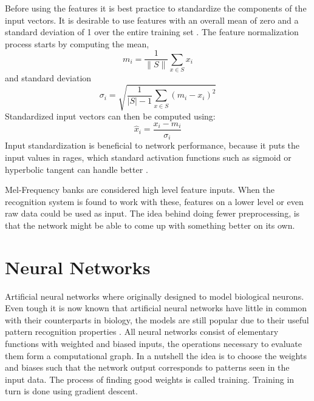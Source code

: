 Before using the features it is best practice to standardize the components of the input vectors. It is desirable to use features with an overall mean of zero and a standard deviation of 1 over the entire training set \cite[page 30]{Graves2008}. The feature normalization process starts by computing the mean,
\begin{equation}
m_i = \frac{1}{\|S\|} \sum\limits_{x \in S} x_i
\end{equation}
and standard deviation
\begin{equation}
\sigma_i = \sqrt{\frac{1}{|S| - 1}\sum\limits_{x \in S}(m_i - x_i)^2}
\end{equation}
Standardized input vectors can then be computed using:
\begin{equation}
\hat{x}_i = \frac{x_i - m_i}{\sigma_i}
\end{equation}
Input standardization is beneficial to network performance, because it puts the input values in rages, which standard activation functions such as sigmoid or hyperbolic tangent can handle better \cite[page 30]{Graves2008}.

Mel-Frequency banks are considered high level feature inputs. When the recognition system is found to work with these, features on a lower level or even raw data could be used as input. The idea behind doing fewer preprocessing, is that the network might be able to come up with something better on its own.

\section{Neural Networks}
Artificial neural networks where originally designed to model biological neurons. Even tough it is now known that artificial neural networks have little in common with their counterparts in biology, the models are still popular due to their useful pattern recognition properties \cite[page 13]{Graves2008}. All neural networks consist of elementary functions with weighted and biased inputs, the operations necessary to evaluate them form a computational graph. In a nutshell the idea is to choose the weights and biases such that the network output corresponds to patterns seen in the input data. The process of finding good weights is called training. Training in turn is done using gradient descent.

